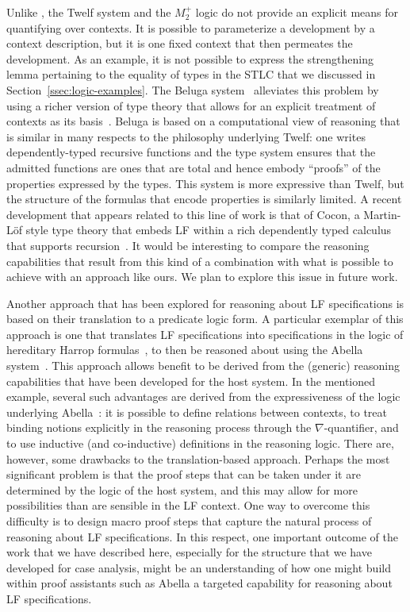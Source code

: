 Unlike \logic, the Twelf system and the $M_2^+$ logic do not
provide an explicit means for quantifying over contexts. It is
possible to parameterize a development by a context description, but
it is one fixed context that then permeates the development.
%
As an example, it is not possible to express the strengthening lemma 
pertaining to the equality of types in the STLC that we discussed in
Section~\ref{ssec:logic-examples}.
%
The Beluga system~\cite{pientka10ijcar} alleviates this problem by using
a richer version of type theory that allows for an explicit treatment
of contexts as its basis~\cite{nanevski08tocl}.
%
Beluga is based on a computational view of reasoning that is similar
in many respects to the philosophy underlying Twelf: one writes
dependently-typed recursive functions and the type system ensures that
the admitted 
functions are ones that are total and hence embody ``proofs'' of the
properties expressed by the types. 
%
This system is more expressive than Twelf, but the structure of the
formulas that encode properties is similarly limited. 
%
A recent development that appears related to this line of work is that
of {\sc Cocon}, a Martin-L\"{o}f style type theory that embeds LF within
a rich dependently typed calculus that supports
recursion~\cite{pientka2019arxiv}. 
%
It would be interesting to compare the reasoning capabilities that
result from this kind of a combination with what is possible to
achieve with an approach like ours.
%
We plan to explore this issue in future work.

Another approach that has been explored for reasoning about LF
specifications is based on their translation to a predicate logic
form.
%
A particular exemplar of this approach is one that translates LF
specifications into specifications in the logic of hereditary Harrop 
formulas~\cite{miller12proghol}, to then be reasoned about using the
Abella system~\cite{southern14fsttcs}.
% 
This approach allows benefit to be derived from 
the (generic) reasoning capabilities that have been developed for the
host system. 
%
In the mentioned example, several such advantages are derived from the
expressiveness of the logic underlying Abella~\cite{gacek11ic}: 
it is possible to define relations between contexts, to treat
binding notions explicitly in the reasoning process through the
$\nabla$-quantifier, and to use inductive (and co-inductive)
definitions in the reasoning logic.
%
There are, however, some drawbacks to the translation-based
approach. 
%
Perhaps the most significant problem is that the proof steps that can
be taken under it are determined by the logic of the host system, and
this may allow for more possibilities than are sensible in the LF
context.  
%
One way to overcome this difficulty is to design macro proof steps
that capture the natural process of reasoning about LF
specifications. 
%
In this respect, one important outcome of the work that we have
described here, especially for the structure that we have developed
for case analysis, might be an understanding of how one might
build within proof assistants such as Abella a targeted
capability for reasoning about LF specifications. 
